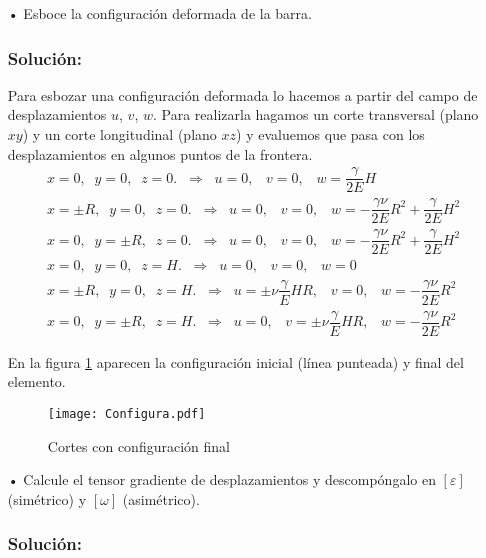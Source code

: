 \documentclass[../notas medios.tex]{subfiles}
\begin{document}
\begin{enumerate}

\item[•] Esboce la configuración deformada de la barra.
	
\subsubsection{Solución:}
	
Para esbozar una configuración deformada lo hacemos a partir del campo de 
desplazamientos $u$, $v$, $w$. Para realizarla  hagamos un corte transversal 
(plano $xy$) y un corte longitudinal (plano $xz$) y evaluemos que pasa con los 
desplazamientos en algunos puntos de la frontera.
\begin{align*}
&x = 0,  \;\;  y = 0,  \;\; z = 0.  \;\;   \Longrightarrow  \;\; u = 0,  
\;\;\;   v = 0, \;\;\;   w = \dfrac{\gamma}{2E} H \\
&x =\pm R,  \;\;  y = 0,  \;\; z = 0.  \;\;   \Longrightarrow  \;\; u = 0,  
\;\;\;   v = 0, \;\;\;   w = - \dfrac{\gamma \nu}{2E} R^2 +  \dfrac{\gamma}{2E} 
H^2\\
&x =0,  \;\;  y = \pm R,  \;\; z = 0.  \;\;   \Longrightarrow  \;\; u = 0,  
\;\;\;   v = 0, \;\;\;   w = - \dfrac{\gamma \nu}{2E} R^2 +  \dfrac{\gamma}{2E} 
H^2\\
&x = 0,  \;\;  y = 0,  \;\; z = H.  \;\;   \Longrightarrow  \;\; u = 0,  
\;\;\;   v = 0, \;\;\;   w = 0  \\
&x = \pm R,  \;\;  y = 0,  \;\; z = H.  \;\;   \Longrightarrow  \;\; u =\pm \nu 
\dfrac{\gamma}{E} H R,   \;\;\;   v = 0, \;\;\;   w = - \dfrac{\gamma \nu}{2E} 
R^2\\
&x = 0,  \;\;  y = \pm R,  \;\; z = H.  \;\;   \Longrightarrow  \;\; u =0,   
\;\;\;   v = \pm \nu \dfrac{\gamma}{E} H R, \;\;\;   w = - \dfrac{\gamma 
\nu}{2E} R^2
\end{align*}

En la figura \cref{ConDef} aparecen la configuración inicial (línea punteada) y 
final del elemento. 
\begin{figure}[h]
	\centering
	\texttt{[image: Configura.pdf]}
	\caption{Cortes con configuración final}
	 \label{ConDef}
\end{figure}
%	
\item[•] Calcule el tensor gradiente de desplazamientos y descompóngalo en 
$[\varepsilon]$ (simétrico) y $[\omega]$ (asimétrico).
	
\subsubsection{Solución:}


\end{enumerate}
\end{document}
